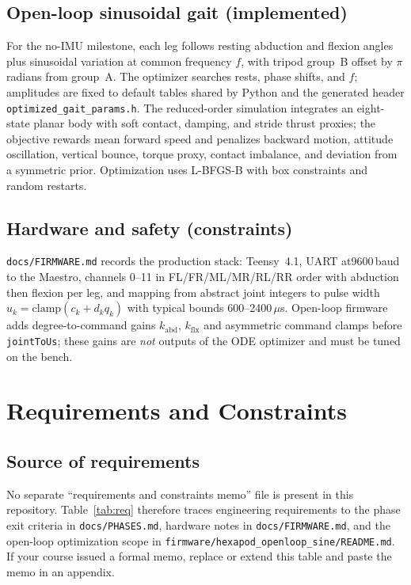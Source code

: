 \documentclass[11pt]{article}
\begin{document}
\subsection{Open-loop sinusoidal gait (implemented)}
For the no-IMU milestone, each leg follows resting abduction and flexion angles plus sinusoidal variation at common frequency $f$, with tripod group~B offset by $\pi$ radians from group~A. The optimizer searches rests, phase shifts, and $f$; amplitudes are fixed to default tables shared by Python and the generated header \texttt{optimized\_gait\_params.h}. The reduced-order simulation integrates an eight-state planar body with soft contact, damping, and stride thrust proxies; the objective rewards mean forward speed and penalizes backward motion, attitude oscillation, vertical bounce, torque proxy, contact imbalance, and deviation from a symmetric prior. Optimization uses L-BFGS-B with box constraints and random restarts.

\subsection{Hardware and safety (constraints)}
\texttt{docs/FIRMWARE.md} records the production stack: Teensy~4.1, UART at9600\,baud to the Maestro, channels 0--11 in FL/FR/ML/MR/RL/RR order with abduction then flexion per leg, and mapping from abstract joint integers to pulse width $u_k = \mathrm{clamp}(c_k + d_k q_k)$ with typical bounds 600--2400\,$\mu$s. Open-loop firmware adds degree-to-command gains $k_{\mathrm{abd}}$, $k_{\mathrm{flx}}$ and asymmetric command clamps before \texttt{jointToUs}; these gains are \emph{not} outputs of the ODE optimizer and must be tuned on the bench.

\section{Requirements and Constraints}

\subsection{Source of requirements}
No separate ``requirements and constraints memo'' file is present in this repository. Table~\ref{tab:req} therefore traces engineering requirements to the phase exit criteria in \texttt{docs/PHASES.md}, hardware notes in \texttt{docs/FIRMWARE.md}, and the open-loop optimization scope in \texttt{firmware/hexapod\_openloop\_sine/README.md}. If your course issued a formal memo, replace or extend this table and paste the memo in an appendix.
\end{document}
